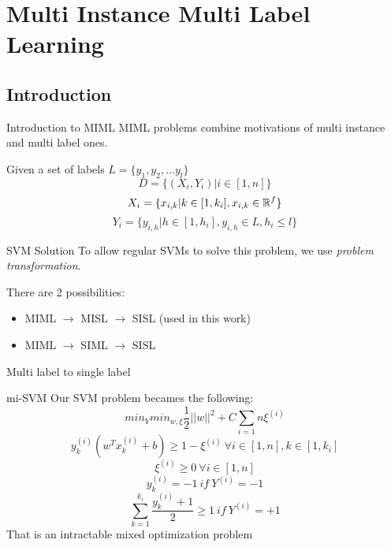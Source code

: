 \section{Multi Instance Multi Label Learning}
 
\subsection{Introduction}
\begin{frame}{Introduction to MIML}
	MIML problems combine motivations of multi instance and multi label ones.
	
	Given a set of labels $L = \{y_1, y_2,... y_l\}$
	$$D = \{(X_i, Y_i) | i \in [1, n]\}$$
	$$X_i = \{x_{i,k} | k \in [1, k_i], x_{i,k} \in \mathbb{R}^f\}$$
	$$Y_i = \{y_{i,h} | h \in [1, h_i], y_{i,h} \in L, h_i \leq l\}$$
\end{frame}

\begin{frame}{SVM Solution}
	To allow regular SVMs to solve this problem, we use \textit{problem transformation}.
	
	There are 2 possibilities:
	\begin{itemize}
		\item MIML $\rightarrow$ MISL $\rightarrow$ SISL (used in this work)
		\item MIML $\rightarrow$ SIML $\rightarrow$ SISL
	\end{itemize}
\end{frame}

\begin{frame}{Multi label to single label}
	
\end{frame}

\begin{frame}{mi-SVM}
	Our SVM problem becames the following:
	$$min_Y min_{w, \xi} \frac{1}{2} ||w||^2 + C \sum_{i = 1}{n}\xi^{(i)}$$
	$$y_k^{(i)} (w^T x_k^{(i)} + b) \geq 1 - \xi^{(i)} \ \forall i \in [1, n], k \in [1, k_i]$$
	$$\xi^{(i)} \geq 0 \ \forall i \in [1, n]$$
	$$y_k^{(i)} = -1 \ if \ Y^{(i)} = -1$$
	$$\sum_{k = 1}^{k_i}\frac{y_k^{(i)} + 1}{2} \geq 1 \ if \ Y^{(i)} = +1$$
	That is an intractable mixed optimization problem
\end{frame}

